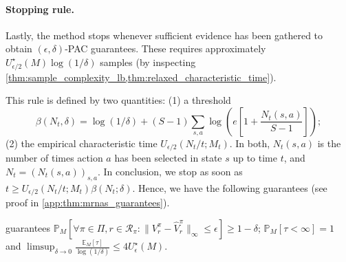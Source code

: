 \paragraph{Stopping rule.} Lastly, the method stops whenever sufficient  evidence has been gathered to obtain  $(\epsilon,\delta)$-PAC guarantees. These requires approximately $U_{\epsilon/2}^\star(M)\log(1/\delta)$ samples (by inspecting \cref{thm:sample_complexity_lb,thm:relaxed_characteristic_time}).

This rule is defined by two quantities: (1) a threshold \[\beta(N_t,\delta) = \log(1/\delta) + (S-1) \sum_{s,a} \log\left(e\left[1 + \frac{N_t(s,a)}{S-1}\right]\right);\] (2) the empirical characteristic time  $U_{\epsilon/2}(N_t/t;M_t)$. In both, $N_t(s,a)$ is the number of times action $a$ has been selected in state $s$ up to time $t$, and $N_t=(N_t(s,a))_{s,a}$. 
In conclusion, we stop as soon as $t \geq U_{\epsilon/2}(N_t/t;M_t)\beta(N_t;\delta)$. Hence, we have the following guarantees  (see proof in \cref{app:thm:mrnas_guarantees}).
\begin{tcolorbox}
\begin{theorem}\label{thm:mrnas_guarantees}
    \mrnas{} 
   guarantees $\mathbb{P}_M[\forall \pi\in \Pi,r\in \mathcal{R}_\pi: \|V_r^\pi - \hat V_r^\pi\|_\infty \leq \epsilon]\geq 1-\delta$; $\mathbb{P}_M[\tau<\infty]=1$ and $\limsup_{\delta \to 0} \frac{\mathbb{E}_M[\tau]}{\log(1/\delta)} \leq 4U_\epsilon^\star(M).$
\end{theorem}
\end{tcolorbox}


